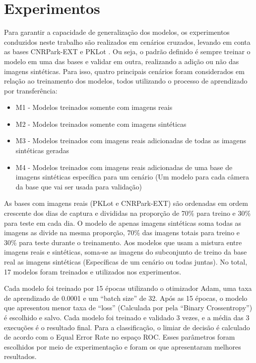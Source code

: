 \chapter{Experimentos}


Para garantir a capacidade de generalização dos modelos, os experimentos conduzidos neste trabalho são realizados em cenários cruzados, levando em conta as bases CNRPark-EXT \citet{cnrpark} e PKLot \citep{pklot2}. Ou seja, o padrão definido é sempre treinar o modelo em uma das bases e validar em outra, realizando a adição ou não das imagens sintéticas. Para isso, quatro principais cenários foram considerados em relação ao treinamento dos modelos, todos utilizando o processo de aprendizado por transferência:
\begin{itemize}
    \item M1 - Modelos treinados somente com imagens reais
    \item M2 - Modelos treinados somente com imagens sintéticas
    \item M3 - Modelos treinados com imagens reais adicionadas de todas as imagens sintéticas geradas
    \item M4 - Modelos treinados com imagens reais adicionadas de uma base de imagens sintéticas específica para um cenário (Um modelo para cada câmera da base que vai ser usada para validação)
\end{itemize}

As bases com imagens reais (PKLot e CNRPark-EXT) são ordenadas em ordem crescente dos dias de captura e divididas na proporção de 70\% para treino e 30\% para teste em cada dia. O modelo de apenas imagens sintéticas soma todas as imagens as divide na mesma  proporção, 70\% das imagens totais para treino e 30\% para teste durante o treinamento. Aos modelos que usam a mistura entre imagens reais e sintéticas, soma-se as imagens do subconjunto de treino da base real as imagens sintéticas (Específicas de um cenário ou todas juntas). No total, 17 modelos foram treinados e utilizados nos experimentos.

Cada modelo foi treinado por 15 épocas utilizando o otimizador Adam, uma taxa de aprendizado de 0.0001 e um “batch size” de 32. Após as 15 épocas, o modelo que apresentou menor taxa de “loss” (Calculada por pela “Binary Crossentropy”) é escolhido e salvo. Cada modelo foi treinado e validado 3 vezes, e a média das 3 execuções é o resultado final. Para a classificação, o limiar de decisão é calculado de acordo com o Equal Error Rate no espaço ROC. Esses parâmetros foram escolhidos por meio de experimentação e foram os que apresentaram melhores resultados.

